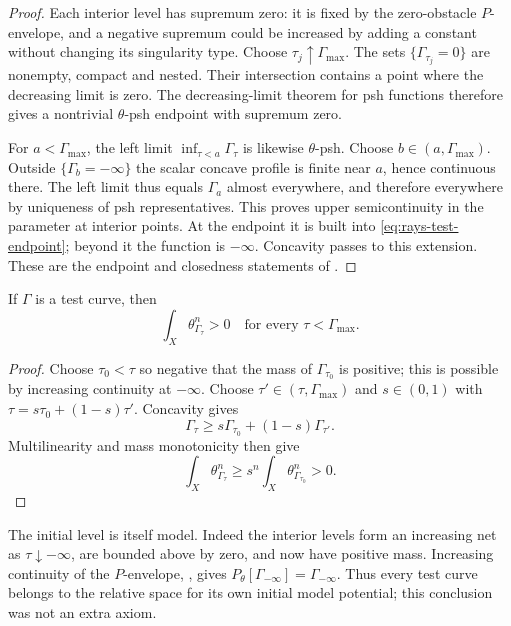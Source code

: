 \begin{proof}
Each interior level has supremum zero: it is fixed by the
zero-obstacle $P$-envelope, and a negative supremum could be
increased by adding a constant without changing its singularity type.
Choose $\tau_j\uparrow\Gamma_{\max}$.
The sets $\{\Gamma_{\tau_j}=0\}$ are nonempty, compact and nested.
Their intersection contains a point where the decreasing limit is
zero.  The decreasing-limit theorem for psh functions therefore
gives a nontrivial $\theta$-psh endpoint with supremum zero.

For $a<\Gamma_{\max}$, the left limit
$\inf_{\tau<a}\Gamma_\tau$ is likewise $\theta$-psh.
Choose $b\in(a,\Gamma_{\max})$.  Outside
$\{\Gamma_b=-\infty\}$ the scalar concave profile is finite near
$a$, hence continuous there.  The left limit thus equals
$\Gamma_a$ almost everywhere, and therefore everywhere by
uniqueness of psh representatives.
This proves upper semicontinuity in the parameter at interior
points.  At the endpoint it is built into
\eqref{eq:rays-test-endpoint}; beyond it the function is
$-\infty$.  Concavity passes to this extension.
These are the endpoint and closedness statements of
\cite[Remark~9.1.1, Proposition~9.1.4]{XiaBook}.
\end{proof}


\begin{lemma}\label{lem:rays-test-positive-levels}
If $\Gamma$ is a test curve, then
\[
                   \int_X\theta_{\Gamma_\tau}^n>0
 \quad\text{for every }\tau<\Gamma_{\max}.
\tag{52.8}\label{eq:rays-test-positive-levels}
\]
\end{lemma}

\begin{proof}
Choose $\tau_0<\tau$ so negative that the mass of
$\Gamma_{\tau_0}$ is positive; this is possible by increasing
continuity at $-\infty$.  Choose
$\tau'\in(\tau,\Gamma_{\max})$ and $s\in(0,1)$ with
$\tau=s\tau_0+(1-s)\tau'$.  Concavity gives
\[
 \Gamma_\tau\geq s\Gamma_{\tau_0}+(1-s)\Gamma_{\tau'}.
\]
Multilinearity and mass monotonicity then give
\[
 \int_X\theta_{\Gamma_\tau}^n
 \geq s^n\int_X\theta_{\Gamma_{\tau_0}}^n>0.
\]
\end{proof}

The initial level is itself model.  Indeed the interior levels form an
increasing net as $\tau\downarrow-\infty$, are bounded above by zero,
and now have positive mass.  Increasing continuity of the $P$-envelope,
\cite[Proposition~3.1.13]{XiaBook}, gives
$P_\theta[\Gamma_{-\infty}]=\Gamma_{-\infty}$.
Thus every test curve belongs to the relative space for its own initial
model potential; this conclusion was not an extra axiom.

